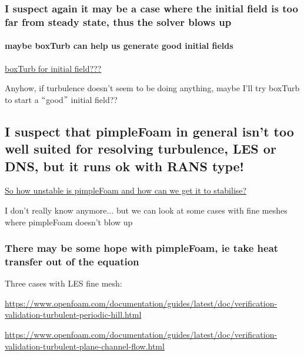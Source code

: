 \documentclass[12pt]{article}
\renewcommand{\_}{\kern-1.5pt\textunderscore\kern-1.5pt}
\begin{document}
\vspace{\baselineskip}

\subsubsection{I suspect again it may be a case where the initial field is too far from steady state, thus the solver blows up}
\paragraph{maybe boxTurb can help us generate good initial fields}
\uline{boxTurb for initial field???}\par

Anyhow, if turbulence doesn’t seem to be doing anything, maybe I’ll try boxTurb to start a $``$good$"$  initial field??\par

\subsection{I suspect that pimpleFoam in general isn't too well suited for resolving turbulence, LES or DNS, but it runs ok with RANS type!}



\uline{So how unstable is pimpleFoam and how can we get it to stabilise?}\par

I don’t really know anymore$ \ldots $  but we can look at some cases with fine meshes where pimpleFoam doesn’t blow up\par


\subsubsection{There may be some hope with pimpleFoam, ie take heat transfer out of the equation}

Three cases with LES fine mesh:\par

\href{https://www.openfoam.com/documentation/guides/latest/doc/verification-validation-turbulent-periodic-hill.html}{https://www.openfoam.com/documentation/guides/latest/doc/verification-validation-turbulent-periodic-hill.html}\par

\href{https://www.openfoam.com/documentation/guides/latest/doc/verification-validation-turbulent-plane-channel-flow.html}{https://www.openfoam.com/documentation/guides/latest/doc/verification-validation-turbulent-plane-channel-flow.html}\par
\end{document}
